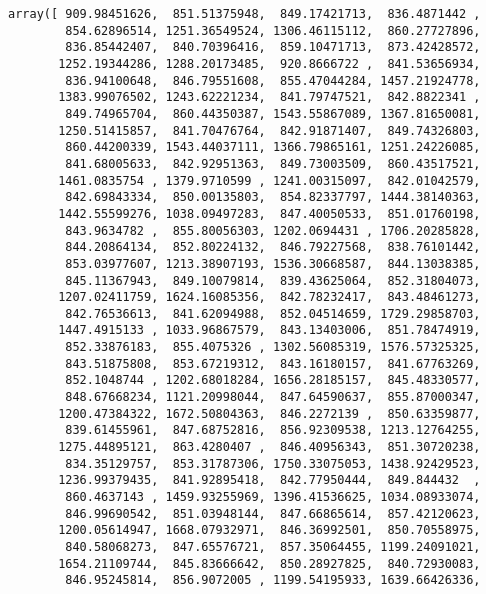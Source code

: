 \documentclass[11pt]{article}
\makeatletter
\newcommand{\boxspacing}{\kern\kvtcb@left@rule\kern\kvtcb@boxsep}
\newcommand{\prompt}[4]{
        {\ttfamily\llap{{\color{#2}[#3]:\hspace{3pt}#4}}\vspace{-\baselineskip}}
    }
\makeatother
\begin{document}
            \begin{tcolorbox}[breakable, size=fbox, boxrule=.5pt, pad at break*=1mm, opacityfill=0]
\prompt{Out}{outcolor}{83}{\boxspacing}
\begin{Verbatim}[commandchars=\\\{\}]
array([ 909.98451626,  851.51375948,  849.17421713,  836.4871442 ,
        854.62896514, 1251.36549524, 1306.46115112,  860.27727896,
        836.85442407,  840.70396416,  859.10471713,  873.42428572,
       1252.19344286, 1288.20173485,  920.8666722 ,  841.53656934,
        836.94100648,  846.79551608,  855.47044284, 1457.21924778,
       1383.99076502, 1243.62221234,  841.79747521,  842.8822341 ,
        849.74965704,  860.44350387, 1543.55867089, 1367.81650081,
       1250.51415857,  841.70476764,  842.91871407,  849.74326803,
        860.44200339, 1543.44037111, 1366.79865161, 1251.24226085,
        841.68005633,  842.92951363,  849.73003509,  860.43517521,
       1461.0835754 , 1379.9710599 , 1241.00315097,  842.01042579,
        842.69843334,  850.00135803,  854.82337797, 1444.38140363,
       1442.55599276, 1038.09497283,  847.40050533,  851.01760198,
        843.9634782 ,  855.80056303, 1202.0694431 , 1706.20285828,
        844.20864134,  852.80224132,  846.79227568,  838.76101442,
        853.03977607, 1213.38907193, 1536.30668587,  844.13038385,
        845.11367943,  849.10079814,  839.43625064,  852.31804073,
       1207.02411759, 1624.16085356,  842.78232417,  843.48461273,
        842.76536613,  841.62094988,  852.04514659, 1729.29858703,
       1447.4915133 , 1033.96867579,  843.13403006,  851.78474919,
        852.33876183,  855.4075326 , 1302.56085319, 1576.57325325,
        843.51875808,  853.67219312,  843.16180157,  841.67763269,
        852.1048744 , 1202.68018284, 1656.28185157,  845.48330577,
        848.67668234, 1121.20998044,  847.64590637,  855.87000347,
       1200.47384322, 1672.50804363,  846.2272139 ,  850.63359877,
        839.61455961,  847.68752816,  856.92309538, 1213.12764255,
       1275.44895121,  863.4280407 ,  846.40956343,  851.30720238,
        834.35129757,  853.31787306, 1750.33075053, 1438.92429523,
       1236.99379435,  841.92895418,  842.77950444,  849.844432  ,
        860.4637143 , 1459.93255969, 1396.41536625, 1034.08933074,
        846.99690542,  851.03948144,  847.66865614,  857.42120623,
       1200.05614947, 1668.07932971,  846.36992501,  850.70558975,
        840.58068273,  847.65576721,  857.35064455, 1199.24091021,
       1654.21109744,  845.83666642,  850.28927825,  840.72930083,
        846.95245814,  856.9072005 , 1199.54195933, 1639.66426336,

\end{Verbatim}
\end{tcolorbox}
\end{document}
